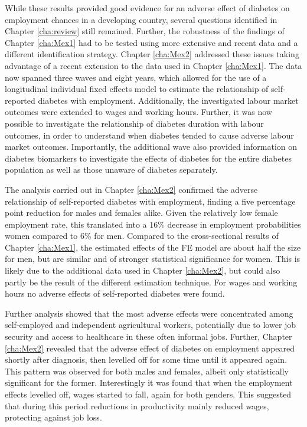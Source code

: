 While these results provided good evidence for an adverse effect of diabetes on employment chances in a developing country, several questions identified in Chapter \ref{cha:review} still remained. Further, the robustness of the findings of Chapter \ref{cha:Mex1} had to be tested using more extensive and recent data and a different identification strategy. Chapter \ref{cha:Mex2} addressed these issues taking advantage of a recent extension to the data used in Chapter \ref{cha:Mex1}. The data now spanned three waves and eight years, which allowed for the use of a longitudinal individual fixed effects model to estimate the relationship of self-reported diabetes with employment. Additionally, the investigated labour market outcomes were extended to wages and working hours. Further, it was now possible to investigate the relationship of diabetes duration with labour outcomes, in order to understand when diabetes tended to cause adverse labour market outcomes. Importantly, the additional wave also provided information on diabetes biomarkers to investigate the effects of diabetes for the entire diabetes population as well as those unaware of diabetes separately.

The analysis carried out in Chapter \ref{cha:Mex2} confirmed the adverse relationship of self-reported diabetes with employment, finding a five percentage point reduction for males and females alike. Given the relatively low female employment rate, this translated into a 16\% decrease in employment probabilities women compared to 6\% for men. Compared to the cross-sectional results of Chapter \ref{cha:Mex1}, the estimated effects of the \ac{FE} model are about half the size for men, but are similar and of stronger statistical significance for women. This is likely due to the additional data used in Chapter \ref{cha:Mex2}, but could also partly be the result of the different estimation technique. For wages and working hours no adverse effects of self-reported diabetes were found.

Further analysis showed that the most adverse effects were concentrated among self-employed and independent agricultural workers, potentially due to lower job security and access to healthcare in these often informal jobs. Further, Chapter \ref{cha:Mex2} revealed that the adverse effect of diabetes on employment appeared shortly after diagnosis, then levelled off for some time until it appeared again. This pattern was observed for both males and females, albeit only statistically significant for the former. Interestingly it was found that when the employment effects levelled off, wages started to fall, again for both genders. This suggested that during this period reductions in productivity mainly reduced wages, protecting against job loss.


